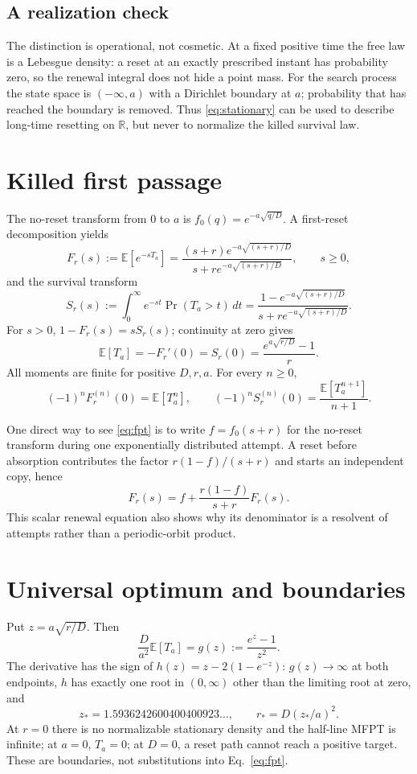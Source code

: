 \documentclass[10pt]{article}
\newcommand{\R}{\mathbb R}
\newcommand{\E}{\mathbb E}
\begin{document}
\subsection*{A realization check}
The distinction is operational, not cosmetic.  At a fixed positive time the
free law is a Lebesgue density: a reset at an exactly prescribed instant has
probability zero, so the renewal integral does not hide a point mass.  For the
search process the state space is $(-\infty,a)$ with a Dirichlet boundary at
$a$; probability that has reached the boundary is removed.  Thus
\eqref{eq:stationary} can be used to describe long-time resetting on $\R$,
but never to normalize the killed survival law.

\section{Killed first passage}
The no-reset transform from $0$ to $a$ is
$f_0(q)=e^{-a\sqrt{q/D}}$.  A first-reset decomposition yields
\begin{equation}
F_r(s):=\E[e^{-sT_a}]
 =\frac{(s+r)e^{-a\sqrt{(s+r)/D}}}
 {s+r e^{-a\sqrt{(s+r)/D}}},
\qquad s\geq0,
\label{eq:fpt}
\end{equation}
and the survival transform
\begin{equation}
S_r(s):=\int_0^\infty e^{-st}\Pr(T_a>t)\,dt
 =\frac{1-e^{-a\sqrt{(s+r)/D}}}
 {s+r e^{-a\sqrt{(s+r)/D}}}.
\label{eq:survival}
\end{equation}
For $s>0$, $1-F_r(s)=sS_r(s)$; continuity at zero gives
\[
\E[T_a]=-F_r'(0)=S_r(0)=\frac{e^{a\sqrt{r/D}}-1}{r}.
\]
All moments are finite for positive $D,r,a$.  For every $n\geq0$,
\begin{equation}
(-1)^nF_r^{(n)}(0)=\E[T_a^n],\qquad
(-1)^nS_r^{(n)}(0)=\frac{\E[T_a^{n+1}]}{n+1}.
\label{eq:moments}
\end{equation}

One direct way to see \eqref{eq:fpt} is to write $f=f_0(s+r)$ for the
no-reset transform during one exponentially distributed attempt.  A reset
before absorption contributes the factor $r(1-f)/(s+r)$ and starts an
independent copy, hence
\[
F_r(s)=f+\frac{r(1-f)}{s+r}F_r(s).
\]
This scalar renewal equation also shows why its denominator is a resolvent of
attempts rather than a periodic-orbit product.

\section{Universal optimum and boundaries}
Put $z=a\sqrt{r/D}$.  Then
\[
\frac D{a^2}\E[T_a]=g(z):=\frac{e^z-1}{z^2}.
\]
The derivative has the sign of
$h(z)=z-2(1-e^{-z})$: $g(z)\to\infty$ at both endpoints,
$h$ has exactly one root in $(0,\infty)$ other than the limiting root at zero,
and
\[
z_*=1.5936242600400400923\ldots,
\qquad r_*=D(z_*/a)^2.
\]
At $r=0$ there is no normalizable stationary density and the half-line
MFPT is infinite; at $a=0$, $T_a=0$; at $D=0$, a reset path cannot reach a
positive target.  These are boundaries, not substitutions into
Eq.~\eqref{eq:fpt}.
\end{document}
